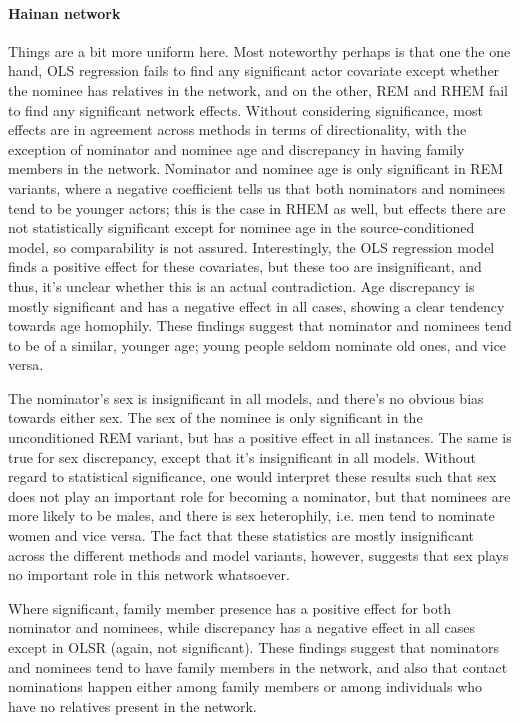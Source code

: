 \paragraph{Hainan network} Things are a bit more uniform here. Most noteworthy perhaps is that one the one hand, OLS regression fails to find any significant actor covariate except whether the nominee has relatives in the network, and on the other, REM and RHEM fail to find any significant network effects. Without considering significance, most effects are in agreement across methods in terms of directionality, with the exception of nominator and nominee age and discrepancy in having family members in the network. Nominator and nominee age is only significant in REM variants, where a negative coefficient tells us that both nominators and nominees tend to be younger actors; this is the case in RHEM as well, but effects there are not statistically significant except for nominee age in the source-conditioned model, so comparability is not assured. Interestingly, the OLS regression model finds a positive effect for these covariates, but these too are insignificant, and thus, it's unclear whether this is an actual contradiction. Age discrepancy is mostly significant and has a negative effect in all cases, showing a clear tendency towards age homophily. These findings suggest that nominator and nominees tend to be of a similar, younger age; young people seldom nominate old ones, and vice versa.

The nominator's sex is insignificant in all models, and there's no obvious bias towards either sex. The sex of the nominee is only significant in the unconditioned REM variant, but has a positive effect in all instances. The same is true for sex discrepancy, except that it's insignificant in all models. Without regard to statistical significance, one would interpret these results such that sex does not play an important role for becoming a nominator, but that nominees are more likely to be males, and there is sex heterophily, i.e. men tend to nominate women and vice versa. The fact that these statistics are mostly insignificant across the different methods and model variants, however, suggests that sex plays no important role in this network whatsoever. 

Where significant, family member presence has a positive effect for both nominator and nominees, while discrepancy has a negative effect in all cases except in OLSR (again, not significant). These findings suggest that nominators and nominees tend to have family members in the network, and also that contact nominations happen either among family members or among individuals who have no relatives present in the network. 

